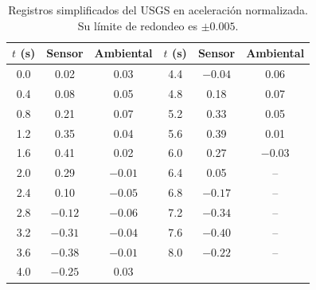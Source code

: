 \documentclass[11pt,letterpaper]{article}
\begin{document}
\begin{table}[H]
\centering
\small
\begin{tabular}{ccc@{\hspace{1.2cm}}ccc}
\toprule
$t$ (s) & Sensor & Ambiental & $t$ (s) & Sensor & Ambiental\\
\midrule
0.0 & 0.02 & 0.03 & 4.4 & $-0.04$ & 0.06\\
0.4 & 0.08 & 0.05 & 4.8 & 0.18 & 0.07\\
0.8 & 0.21 & 0.07 & 5.2 & 0.33 & 0.05\\
1.2 & 0.35 & 0.04 & 5.6 & 0.39 & 0.01\\
1.6 & 0.41 & 0.02 & 6.0 & 0.27 & $-0.03$\\
2.0 & 0.29 & $-0.01$ & 6.4 & 0.05 & --\\
2.4 & 0.10 & $-0.05$ & 6.8 & $-0.17$ & --\\
2.8 & $-0.12$ & $-0.06$ & 7.2 & $-0.34$ & --\\
3.2 & $-0.31$ & $-0.04$ & 7.6 & $-0.40$ & --\\
3.6 & $-0.38$ & $-0.01$ & 8.0 & $-0.22$ & --\\
4.0 & $-0.25$ & 0.03 & & & \\
\bottomrule
\end{tabular}
\caption{Registros simplificados del USGS en aceleración normalizada. Su límite de redondeo es $\pm 0.005$.}
\label{tab:datos}
\end{table}
\end{document}

